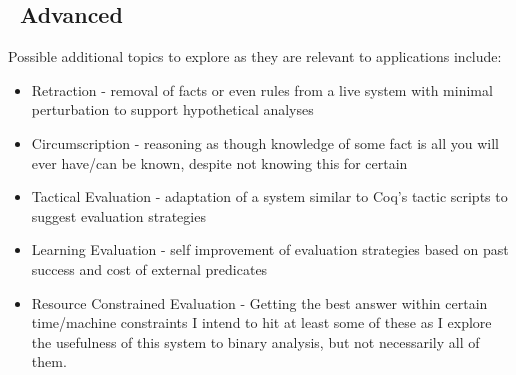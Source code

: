 \subsection{\sysname\ Advanced}
Possible additional topics to explore as they are relevant to applications include:
\begin{itemize}
\item Retraction - removal of facts or even rules from a live system with minimal perturbation to support hypothetical analyses
\item Circumscription - reasoning as though knowledge of some fact is all you will ever have/can be known, despite not knowing this for certain
\item Tactical Evaluation - adaptation of a system similar to Coq's tactic scripts to suggest evaluation strategies
\item Learning Evaluation - self improvement of evaluation strategies based on past success and cost of external predicates
\item Resource Constrained Evaluation - Getting the best answer within certain time/machine constraints
I intend to hit at least some of these as I explore the usefulness of this system to binary analysis, but not necessarily all of them.
\end{itemize}
